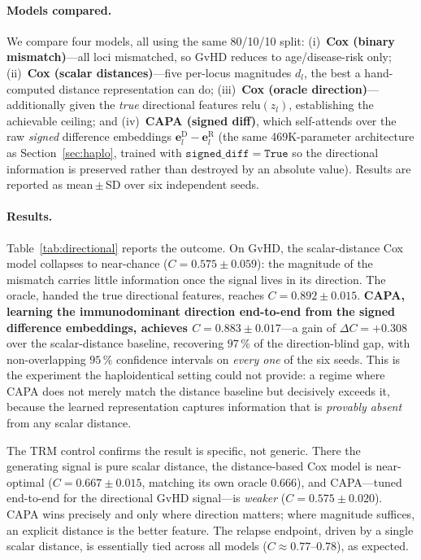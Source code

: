 \documentclass[11pt,a4paper]{article}
\begin{document}
\paragraph{Models compared.}
We compare four models, all using the same 80/10/10 split:
(i)~\textbf{Cox (binary mismatch)}---all loci mismatched, so GvHD reduces to
age/disease-risk only;
(ii)~\textbf{Cox (scalar distances)}---five per-locus magnitudes $d_l$, the best
a hand-computed distance representation can do;
(iii)~\textbf{Cox (oracle direction)}---additionally given the \emph{true}
directional features $\mathrm{relu}(z_l)$, establishing the achievable ceiling;
and (iv)~\textbf{CAPA (signed diff)}, which self-attends over the raw
\emph{signed} difference embeddings $\mathbf{e}^{\mathrm{D}}_l -
\mathbf{e}^{\mathrm{R}}_l$ (the same 469K-parameter architecture as
Section~\ref{sec:haplo}, trained with $\mathtt{signed\_diff}{=}\mathtt{True}$ so
the directional information is preserved rather than destroyed by an absolute
value).  Results are reported as mean\,$\pm$\,SD over six independent seeds.

\paragraph{Results.}
Table~\ref{tab:directional} reports the outcome.  On GvHD, the scalar-distance
Cox model collapses to near-chance ($C = 0.575 \pm 0.059$): the magnitude of the
mismatch carries little information once the signal lives in its direction.  The
oracle, handed the true directional features, reaches $C = 0.892 \pm 0.015$.
\textbf{CAPA, learning the immunodominant direction end-to-end from the signed
difference embeddings, achieves $C = 0.883 \pm 0.017$}---a gain of
$\Delta C = +0.308$ over the scalar-distance baseline, recovering $97\,\%$ of
the direction-blind gap, with non-overlapping $95\,\%$ confidence intervals on
\emph{every one} of the six seeds.  This is the experiment the haploidentical
setting could not provide: a regime where CAPA does not merely match the
distance baseline but decisively exceeds it, because the learned representation
captures information that is \emph{provably absent} from any scalar distance.

The TRM control confirms the result is specific, not generic.  There the
generating signal is pure scalar distance, the distance-based Cox model is
near-optimal ($C = 0.667 \pm 0.015$, matching its own oracle $0.666$), and
CAPA---tuned end-to-end for the directional GvHD signal---is \emph{weaker}
($C = 0.575 \pm 0.020$).  CAPA wins precisely and only where direction matters;
where magnitude suffices, an explicit distance is the better feature.  The
relapse endpoint, driven by a single scalar distance, is essentially tied
across all models ($C \approx 0.77$--$0.78$), as expected.
\end{document}
